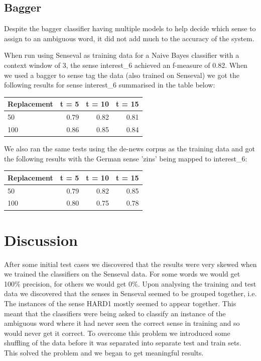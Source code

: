 \documentclass[a4wide,10pt]{article}
\begin{document}
\subsection{Bagger}
Despite the bagger classifier having multiple models to help decide which
sense to assign to an ambiguous word,  it did not add much to the accuracy
of the system.

When run using Senseval as training data for a Naive Bayes classifier
with a context window of 3, the sense interest\_6 achieved an f-measure
of 0.82.  When we used a bagger to sense tag the data (also trained on
Senseval) we got the following results for sense interest\_6 summarised 
in the table below:\\
\begin{center}
\begin{tabular}{|l|r|r|r|}
\hline
Replacement & t = 5 & t = 10 & t = 15\\
\hline\hline
50 & 0.79 & 0.82 & 0.81\\
\hline
100 & 0.86 & 0.85 & 0.84\\
\hline
\end{tabular}
\end{center}
We also ran the same tests using the de-news corpus as the training data
and got the following results with the German sense 'zins' being mapped to
interest\_6:\\
\begin{center}
\begin{tabular}{|l|r|r|r|}
\hline
Replacement & t = 5 & t = 10 & t = 15\\
\hline\hline
50 & 0.79 & 0.82  & 0.85 \\
\hline
100 & 0.80  & 0.75 & 0.78\\
\hline
\end{tabular}
\end{center}




\section{Discussion}
After some initial test cases we discovered that the results were very skewed
when we trained the classifiers on the Senseval data.
For some words we would get 100\% precision,  for others we would get 0\%.
Upon analysing the training and test data we discovered that the senses in
Senseval seemed to be grouped together, i.e. The instances of the sense
HARD1 mostly seemed to appear together.  This meant that the classifiers were
being asked to classify an instance of the ambiguous word where it had never
seen the correct sense in training and so would never get it correct.
To overcome this problem we introduced some shuffling of the data before it was
separated into separate test and train sets.
This solved the problem and we began to get meaningful results.
\end{document}
